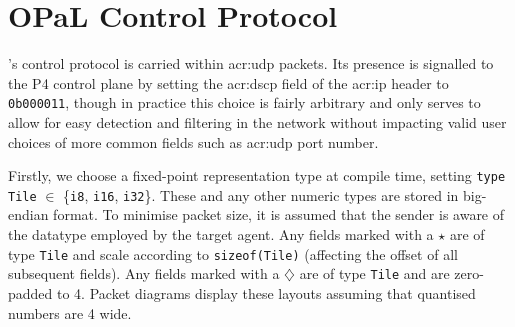 \chapter{OPaL Control Protocol}
\label{adx:opal-proto}

\approachshort{}'s control protocol is carried within \gls{acr:udp} packets.
Its presence is signalled to the P4 control plane by setting the \gls{acr:dscp} field of the \gls{acr:ip} header to \texttt{0b000011}, though in practice this choice is fairly arbitrary and only serves to allow for easy detection and filtering in the network without impacting valid user choices of more common fields such as \gls{acr:udp} port number.

Firstly, we choose a fixed-point representation type at compile time, setting \texttt{type Tile} $\in$ \{\texttt{i8}, \texttt{i16}, \texttt{i32}\}.
These and any other numeric types are stored in big-endian format.
To minimise packet size, it is assumed that the sender is aware of the datatype employed by the target \approachshort{} agent.
Any fields marked with a $\star$ are of type \texttt{Tile} and scale according to \texttt{sizeof(Tile)} (affecting the offset of all subsequent fields).
Any fields marked with a $\diamondsuit$ are of type \texttt{Tile} and are zero-padded to \qty{4}{\byte}.
Packet diagrams display these layouts assuming that quantised numbers are \qty{4}{\byte} wide.

